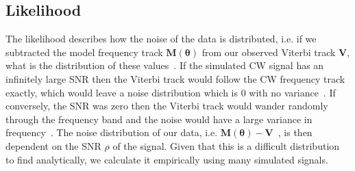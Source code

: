 %
%
\subsection{\label{par_est:bayes:likelihood}Likelihood}
%
%

The likelihood describes how the noise of the data is distributed, i.e. if we
subtracted the model frequency track $\bm{M}(\bm{\theta})$ from our observed
Viterbi track $\bm{V}$, what is the distribution of these values~. If the simulated \gls{CW} signal has an infinitely large \gls{SNR}
then the Viterbi track would follow the \gls{CW} frequency track exactly, which
would leave a noise distribution which is 0 with no
variance~. If conversely, the \gls{SNR} was zero then the Viterbi track would
wander randomly through the frequency band and the noise would have a large
variance in frequency~. The noise distribution of our data, i.e. $\bm{M}(\bm{\theta}) -
\bm{V}$~, is then
dependent on the \gls{SNR} $\rho$ of the signal.  Given that this is a
difficult distribution to find analytically, we calculate it empirically using
many simulated signals.

